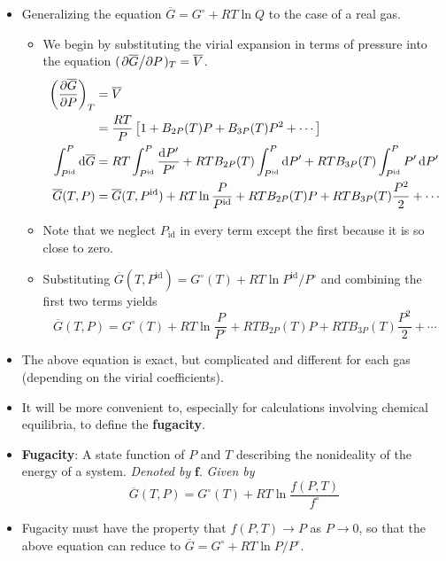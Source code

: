 \documentclass[../notes.tex]{subfiles}
\begin{document}
\begin{itemize}
    \item Generalizing the equation $\overline{G}=G^\circ+RT\ln Q$ to the case of a real gas.
    \begin{itemize}
        \item We begin by substituting the virial expansion in terms of pressure into the equation $(\pdv*{\overline{G}}{P})_T=\overline{V}$.
        \begin{align*}
            \left( \pdv{\overline{G}}{P} \right)_T &= \overline{V}\\
            &= \frac{RT}{P}\left[ 1+B_{2P}(T)P+B_{3P}(T)P^2+\cdots \right]\\
            \int_{P^\text{id}}^P\dd{\overline{G}} &= RT\int_{P^\text{id}}^P\frac{\dd{P'}}{P'}+RTB_{2P}(T)\int_{P^\text{id}}^P\dd{P'}+RTB_{3P}(T)\int_{P^\text{id}}^PP'\dd{P'}\\
            \overline{G}(T,P) &= \overline{G}(T,P^\text{id})+RT\ln\frac{P}{P^\text{id}}+RTB_{2P}(T)P+RTB_{3P}(T)\frac{P^2}{2}+\cdots
        \end{align*}
        \item Note that we neglect $P_\text{id}$ in every term except the first because it is so close to zero.
        \item Substituting $\overline{G}(T,P^\text{id})=G^\circ(T)+RT\ln P^\text{id}/P^\circ$ and combining the first two terms yields
        \begin{equation*}
            \overline{G}(T,P) = G^\circ(T)+RT\ln\frac{P}{P^\circ}+RTB_{2P}(T)P+RTB_{3P}(T)\frac{P^2}{2}+\cdots
        \end{equation*}
    \end{itemize}
    \item The above equation is exact, but complicated and different for each gas (depending on the virial coefficients).
    \item It will be more convenient to, especially for calculations involving chemical equilibria, to define the \textbf{fugacity}.
    \item \textbf{Fugacity}: A state function of $P$ and $T$ describing the nonideality of the energy of a system. \emph{Denoted by} $\bm{f}$. \emph{Given by}
    \begin{equation*}
        \overline{G}(T,P) = G^\circ(T)+RT\ln\frac{f(P,T)}{f^\circ}
    \end{equation*}
    \item Fugacity must have the property that $f(P,T)\to P$ as $P\to 0$, so that the above equation can reduce to $\overline{G}=G^\circ+RT\ln P/P^\circ$.

\end{itemize}
\end{document}
